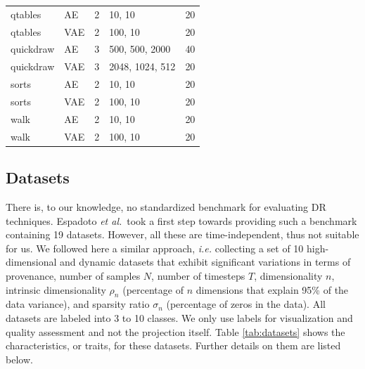 \begin{table}[tb]
\begin{tabular}{llcll}
qtables    & AE  & 2                & 10, 10                      & 20        \\
qtables    & VAE  & 2                & 100, 10                     & 20        \\
quickdraw  & AE  & 3                & 500, 500, 2000              & 40        \\
quickdraw  & VAE  & 3                & 2048, 1024, 512             & 20        \\
sorts      & AE  & 2                & 10, 10                      & 20        \\
sorts      & VAE  & 2                & 100, 10                     & 20        \\
walk       & AE  & 2                & 10, 10                      & 20        \\
walk       & VAE  & 2                & 100, 10                     & 20        \\ \hline
\end{tabular}
\vspace{-0.15cm}
\end{table}


\subsection{Datasets}
\label{subsec:datasets}
%
There is, to our knowledge, no standardized benchmark for evaluating DR techniques. Espadoto \emph{et al.}\,\cite{EspadotoSurvey} took a first step towards providing such a benchmark containing 19 datasets. However, all these are time-independent, thus not suitable for us. We followed here a similar approach, \emph{i.e.} collecting a set of 10 high-dimensional and dynamic datasets that exhibit significant variations in terms of provenance, number of samples $N$, number of timesteps $T$, dimensionality $n$, intrinsic dimensionality $\rho_n$ (percentage of $n$ dimensions that explain 95\% of the data variance), and sparsity ratio $\sigma_n$ (percentage of zeros in the data). All datasets are labeled into 3 to 10 classes. We only use labels for visualization and quality assessment and not the projection itself. Table \ref{tab:datasets} shows the characteristics, or traits, for these datasets. Further details on them are listed below.

